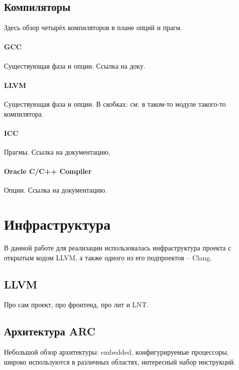\documentclass[12pt,a4paper]{article}
\begin{document}
\subsection{Компиляторы}

Здесь обзор четырёх компиляторов в плане опций и прагм.

\paragraph{GCC}

Существующая фаза и опции. Ссылка на доку.

\paragraph{LLVM}

Существующая фаза и опции. В скобках: см. в таком-то модуле такого-то компилятора.

\paragraph{ICC}

Прагмы. Ссылка на документацию.

\paragraph{Oracle C/C++ Compiler}

Опции. Ссылка на документацию.

\section{Инфраструктура}

В данной работе для реализации использовалась инфраструктура проекта с открытым кодом LLVM, а также одного из его подпроектов -- Clang.

\subsection{LLVM}

Про сам проект, про фронтенд, про лит и LNT.

\subsection{Архитектура ARC}

Небольшой обзор архитектуры: embedded, конфигурируемые процессоры, широко используются в различных областях, интересный набор инструкций.
\end{document}
